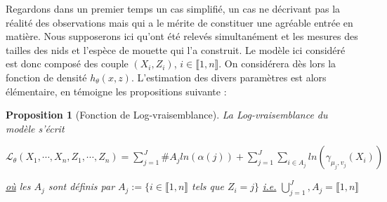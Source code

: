 \documentclass[frenchb]{report}
\newcommand{\1}{\mathbbm{1}}
\newtheorem{prop}{Proposition}
\theoremstyle{definition}\newtheorem{defn}{Définition}
\theoremstyle{definition}\newtheorem{exm}{Exemple}
\theoremstyle{definition}\newtheorem{nota}{Notation}
\theoremstyle{definition}\newtheorem{rem}{Remarque}
\begin{document}
Regardons dans un premier temps un cas simplifié, un cas ne décrivant pas la réalité des observations mais qui a le mérite de constituer une agréable entrée en matière. \newline
Nous supposerons ici qu'ont été relevés simultanément et les mesures des tailles des nids et l'espèce de mouette qui l'a construit. Le modèle ici considéré est donc composé des couple $(X_i, Z_i)$, $i \in \llbracket1,n \rrbracket$. On considérera dès lors la fonction de densité $h_\theta(x,z)$.\newline
L'estimation des divers paramètres est alors élémentaire, en témoigne les propositions suivante :
\begin{prop}[Fonction de Log-vraisemblance]
La Log-vraisemblance du modèle s'écrit
\begin{center} $\mathcal{L}_\theta(X_1, \cdots, X_n, Z_1, \cdots, Z_n) = \displaystyle \sum_{j=1}^J \#A_j ln(\alpha(j)) + \sum_{j=1}^J\sum_{i\in A_j}ln(\gamma_{\mu_j, v_j}(X_i))$ \end{center}
\underline{où} les $A_j$ sont définis par $A_j := \{ i\in \llbracket1,n \rrbracket$ tels que $Z_i = j \}$ \underline{i.e.} $\displaystyle\bigcup_{j=1}^J, A_j = \llbracket1,n \rrbracket$
\end{prop}
\end{document}
